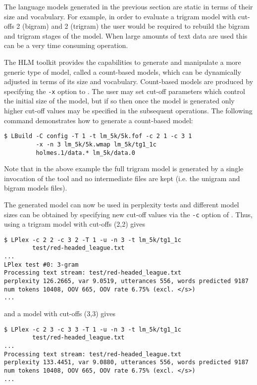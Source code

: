 The language models generated in the previous section are static in
terms of their size and vocabulary. For example, in order to evaluate
a trigram model with cut-offs 2 (bigram) and 2 (trigram) the user
would be required to rebuild the bigram and trigram stages of the
model.  When large amounts of text data are used this can be a very
time consuming operation.

The HLM toolkit provides the capabilities to generate and manipulate a
more generic type of model, called a count-based models, which can be
dynamically adjusted in terms of its size and vocabulary.  Count-based
models are produced by specifying the \texttt{-x} option to
.  The user may set cut-off parameters which control the
initial size of the model, but if so then once the model is generated
only higher cut-off values may be specified in the subsequent
operations.  The following command demonstrates how to generate a
count-based model:
\begin{verbatim}
$ LBuild -C config -T 1 -t lm_5k/5k.fof -c 2 1 -c 3 1 
         -x -n 3 lm_5k/5k.wmap lm_5k/tg1_1c 
         holmes.1/data.* lm_5k/data.0
\end{verbatim} %
Note that in the above example the full trigram model is generated
by a single invocation of the tool and no intermediate files are
kept (i.e. the unigram and bigram models files).  

The generated model can now be used in perplexity tests and different
model sizes can be obtained by specifying new cut-off values via the
\texttt{-c} option of .  Thus, using a trigram model with 
cut-offs (2,2) gives
\begin{verbatim}
$ LPlex -c 2 2 -c 3 2 -T 1 -u -n 3 -t lm_5k/tg1_1c 
        test/red-headed_league.txt
...
LPlex test #0: 3-gram 
Processing text stream: test/red-headed_league.txt
perplexity 126.2665, var 9.0519, utterances 556, words predicted 9187
num tokens 10408, OOV 665, OOV rate 6.75% (excl. </s>)
...
\end{verbatim} %
and a model with cut-offs (3,3) gives
\begin{verbatim}
$ LPlex -c 2 3 -c 3 3 -T 1 -u -n 3 -t lm_5k/tg1_1c 
        test/red-headed_league.txt
...
Processing text stream: test/red-headed_league.txt
perplexity 133.4451, var 9.0880, utterances 556, words predicted 9187
num tokens 10408, OOV 665, OOV rate 6.75% (excl. </s>)
...
\end{verbatim} %

